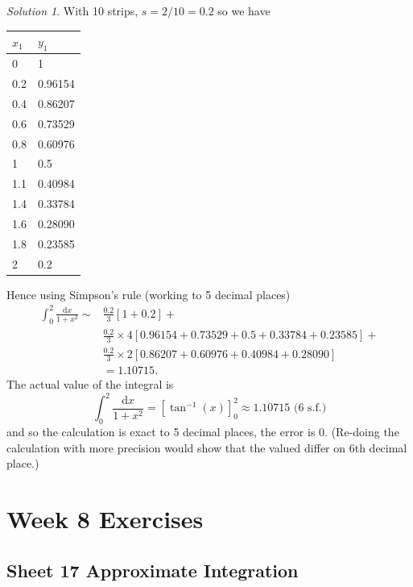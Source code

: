 \documentclass[
  english,
  11pt,
  oneside]{book}
\newcommand{\slide}{}
\theoremstyle{definition}
\theoremstyle{definition}
\theoremstyle{definition}
\theoremstyle{definition}
\theoremstyle{remark}
\newtheorem*{solution}{Solution}
\begin{document}
\begin{solution}
With 10 strips, \(s=2/10=0.2\) so we have

\begin{tabular}{l|l}
\hline
$x_1$ & $y_1$\\
\hline
0 & 1\\
\hline
0.2 & 0.96154\\
\hline
0.4 & 0.86207\\
\hline
0.6 & 0.73529\\
\hline
0.8 & 0.60976\\
\hline
1 & 0.5\\
\hline
1.1 & 0.40984\\
\hline
1.4 & 0.33784\\
\hline
1.6 & 0.28090\\
\hline
1.8 & 0.23585\\
\hline
2 & 0.2\\
\hline
\end{tabular}

Hence using Simpson's rule (working to 5 decimal places)
\begin{align*}
\int_0^2\frac{\mathrm{d}x}{1+x^2} \sim& \frac{0.2}3\left[1 + 0.2\right] +\\
&\frac{0.2}3\times 4\left[0.96154+0.73529+0.5+0.33784+0.23585\right]+\\
&\frac{0.2}3\times 2\left[0.86207+0.60976+0.40984+0.28090\right]\\
&= 1.10715.
\end{align*}
The actual value of the integral is
\[\int_0^2\frac{\mathrm{d}x}{1+x^2} = \left[\tan^{-1}(x)\right]_0^2 \approx 1.10715 \text{ (6 s.f.)}\]
and so the calculation is exact to 5 decimal places, the error is 0. (Re-doing the calculation with more precision would show that the valued differ on 6th decimal place.)
\end{solution}

\begin{slidesonly}

\hbox{}
\slide
\hbox{}
\slide
\hbox{}
\slide

\end{slidesonly}

\chapter*{Week 8 Exercises}\label{week-8-exercises}

\section{Sheet 17 Approximate Integration}\label{sheet-17-approximate-integration}
\end{document}
